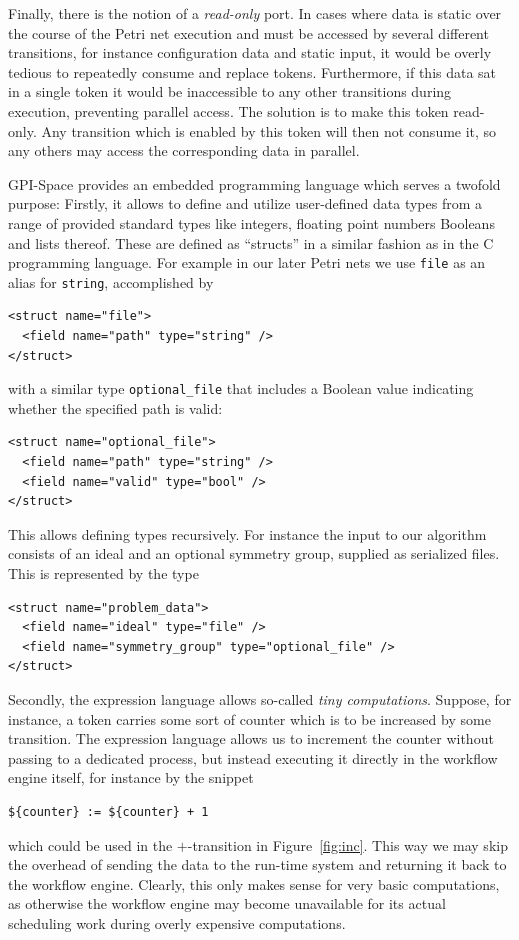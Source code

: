 \documentclass[
  paper=a4,
  titlepage,
  bibliography=totoc,
  pagesize=pdftex
]{scrartcl}
\numberwithin{figure}{section}
\numberwithin{equation}{section}
\numberwithin{table}{section}
\theoremstyle{definition}
\numberwithin{definition}{section}
\begin{document}
Finally, there is the notion of a \emph{read-only} port. In cases where data is static
over the course of the Petri net execution and must be accessed by several different
transitions, for instance configuration data and static input, it would be overly tedious
to repeatedly consume and replace tokens. Furthermore, if this data sat in a single token
it would be inaccessible to any other transitions during execution, preventing parallel
access. The solution is to make this token read-only. Any transition which is enabled by
this token will then not consume it, so any others may access the corresponding data in
parallel.

GPI-Space provides an embedded programming language which serves a twofold purpose:
Firstly, it allows to define and utilize user-defined data types from a range of provided
standard types like integers, floating point numbers Booleans and lists thereof. These are
defined as \enquote{structs} in a similar fashion as in the C programming language. For
example in our later Petri nets we use \texttt{file} as an alias for \texttt{string},
accomplished by
\begin{verbatim}
<struct name="file">
  <field name="path" type="string" />
</struct>\end{verbatim}%
with a similar type \texttt{optional\_file} that includes a Boolean value indicating
whether the specified path is valid:
\begin{verbatim}
<struct name="optional_file">
  <field name="path" type="string" />
  <field name="valid" type="bool" />
</struct>\end{verbatim}%
This allows defining types recursively. For instance the input to our algorithm consists
of an ideal and an optional symmetry group, supplied as serialized files. This is
represented by the type
\begin{verbatim}
<struct name="problem_data">
  <field name="ideal" type="file" />
  <field name="symmetry_group" type="optional_file" />
</struct>\end{verbatim}%

Secondly, the expression language allows so-called \emph{tiny computations}. Suppose, for
instance, a token carries some sort of counter which is to be increased by some
transition. The expression language allows us to increment the counter without passing to
a dedicated process, but instead executing it directly in the workflow engine itself, for
instance by the snippet
\begin{verbatim}${counter} := ${counter} + 1\end{verbatim}
which could be used in the $+$-transition in Figure~\ref{fig:inc}. This way we may skip
the overhead of sending the data to the run-time system and returning it back to the
workflow engine. Clearly, this only makes sense for very basic computations, as otherwise
the workflow engine may become unavailable for its actual scheduling work during overly
expensive computations.
\end{document}
